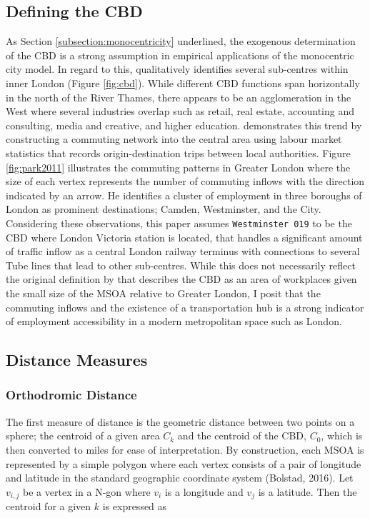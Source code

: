 \documentclass{article}
\begin{document}
\subsection{Defining the CBD}\label{subsection:CBD}
As Section \ref{subsection:monocentricity} underlined, the exogenous determination of the CBD is a strong assumption in empirical applications of the monocentric city model. In regard to this, \citet{GreaterLondonAuthority2008LondonsImportance} qualitatively identifies several sub-centres within inner London (Figure \ref{fig:cbd}). While different CBD functions span horizontally in the north of the River Thames, there appears to be an agglomeration in the West where several industries overlap such as retail, real estate, accounting and consulting, media and creative, and higher education. \citet{Park2011SpatialAngeles} demonstrates this trend by constructing a commuting network into the central area using labour market statistics that records origin-destination trips between local authorities. Figure \ref{fig:park2011} illustrates the commuting patterns in Greater London where the size of each vertex represents the number of commuting inflows with the direction indicated by an arrow. He identifies a cluster of employment in three boroughs of London as prominent destinations; Camden, Westminster, and the City. Considering these observations, this paper assumes  \texttt{Westminster 019} to be the CBD where London Victoria station is located, that handles a significant amount of traffic inflow as a central London railway terminus with connections to several Tube lines that lead to other sub-centres. While this does not necessarily reflect the original definition by \citet{AlonsoWilliam1964Lalu} that describes the CBD as an area of workplaces given the small size of the MSOA relative to Greater London, I posit that the commuting inflows and the existence of a transportation hub is a strong indicator of employment accessibility in a modern metropolitan space such as London.

\subsection{Distance Measures}
\subsubsection{Orthodromic Distance}
The first measure of distance is the geometric distance between two points on a sphere; the centroid of a given area $C_k$ and the centroid of the CBD, $C_0$, which is then converted to miles for ease of interpretation. By construction, each MSOA is represented by a simple polygon where each vertex consists of a pair of longitude and latitude in the standard geographic coordinate system (Bolstad, 2016). Let $v_{i,j}$ be a vertex in a N-gon where $v_i$ is a longitude and $v_j$ is a latitude. Then the centroid for a given $k$ is expressed as 
\end{document}
